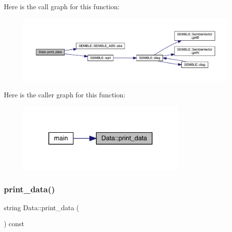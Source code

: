 Here is the call graph for this function\+:
\nopagebreak
\begin{figure}[H]
\begin{center}
\leavevmode
\includegraphics[width=350pt]{d0/df3/classData_a8663c7e41a90bdc730ff8b6cbe046c52_cgraph}
\end{center}
\end{figure}
Here is the caller graph for this function\+:
\nopagebreak
\begin{figure}[H]
\begin{center}
\leavevmode
\includegraphics[width=241pt]{d0/df3/classData_a8663c7e41a90bdc730ff8b6cbe046c52_icgraph}
\end{center}
\end{figure}
\mbox{\label{classData_a255a7abe193d5dfbd77fb957942bda64}} 
\subsubsection{\texorpdfstring{print\_data()}{print\_data()}\hspace{0.1cm}{\footnotesize\ttfamily [3/4]}}
{\footnotesize\ttfamily string Data\+::print\+\_\+data (\begin{DoxyParamCaption}{ }\end{DoxyParamCaption}) const\hspace{0.3cm}{\ttfamily [inline]}}


